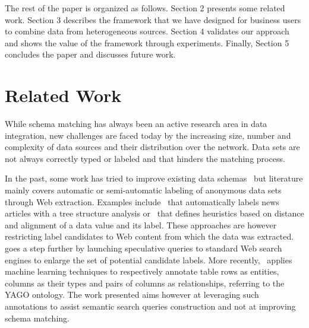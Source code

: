 \documentclass{../../Util/LaTEX/sig-alternate}
\begin{document}
The rest of the paper is organized as follows. Section 2 presents some related work. Section 3 describes the framework that we have designed for business users to combine data from heterogeneous sources. Section 4 validates our approach and shows the value of the framework through experiments. Finally, Section 5 concludes the paper and discusses future work.


\section{Related Work}

While schema matching has always been an active research area in data integration, new challenges are faced today by the increasing size, number and complexity of data sources and their distribution over the network. Data sets are not always correctly typed or labeled and that hinders the matching process.

In the past, some work has tried to improve existing data schemas~\cite{ DBLP:journals/debu/MillerA03} but literature mainly covers automatic or semi-automatic labeling of anonymous data sets through Web extraction. Examples include~\cite{cas04} that automatically labels news articles with a tree structure analysis or~\cite{wang2003extraction} that defines heuristics based on distance and alignment of a data value and its label. These approaches are however restricting label candidates to Web content from which the data was extracted.~\cite{DBLP:conf/otm/SilvaBCS07} goes a step further by launching speculative queries to standard Web search engines to enlarge the set of potential candidate labels. More recently,~\cite{Limaye:2010:ASW:1920841.1921005} applies machine learning techniques to respectively annotate table rows as entities, columns as their types and pairs of columns as relationships, referring to the YAGO ontology. The work presented aims however at leveraging such annotations to assist semantic search queries construction and not at improving schema matching.
\end{document}

